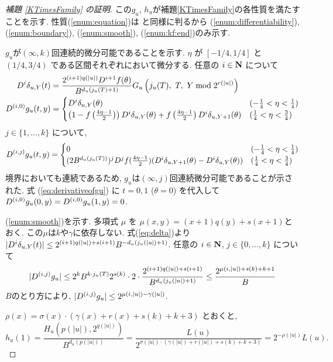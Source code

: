 \begin{proof}[\rm 補題 \ref{KTimesFamily} の証明]
この$g_u$, $h_u$が補題\ref{KTimesFamily}の各性質を満たすことを示す. 
性質(\ref{enum:equation})は
\cite[補題 4.1]{kawamura2010lipschitz}と同様に判るから
(\ref{enum:differentiability}), 
(\ref{enum:boundary}), 
(\ref{enum:smooth}), 
(\ref{enum:kf:end})のみ示す. 

  $g _u$が$(\infty, k)$回連続的微分可能であることを示す.
  $\eta$ が $[-1/4, 1/4]$ と $(1/4, 3/4)$ である区間それぞれにおいて微分する.
  任意の $i \in \mathbf N$ について
  \begin{align}
   D^i \delta_{u,Y}(t) 
&
    = \frac{2^{(i+1)q(|u|)} D^{i+1}f(\theta)}{B^{d_u(j_u(T)+1)}}
    G_u\left( j_u(T),\ T,\ Y \bmod 2^{r(|u|)} \right)
\\
   \label{eq:derivativeofgu}
    D^{(i,0)} g_u(t, y)
&
     = \begin{cases}
 	D^i \delta_{u, Y}(\theta) 
	& (- \frac 1 4 < \eta < \frac 1 4) \\
	\left( 1-f \left(\frac{4\eta-1}{2}\right)\right) 
	D^i \delta_{u, Y}(\theta) 
	+ f \left(\frac{4\eta-1}{2}\right) D^i \delta_{u,Y+1}(\theta) 
	& (\frac 1 4 < \eta < \frac 3 4)
       \end{cases}
  \end{align}
  $j \in \{1, \dots , k\}$ について,
  \begin{equation}
    D^{(i,j)} g_u(t, y)
     = \begin{cases}
	0 & (- \frac 1 4 < \eta < \frac 1 4) \\
	(2B^{d_u(j_u(T))})^j D^j f(\frac{4\eta - 1}2)
	(D^i \delta_{u,Y+1}(\theta)-D^i \delta_{u, Y}(\theta)) 
	& (\frac 1 4 < \eta < \frac 3 4)
       \end{cases}
  \end{equation}
  境界においても連続であるため,
  $g _u$は$(\infty, j)$回連続微分可能であることが示された.
  式 (\ref{eq:derivativeofgu}) に $t = 0, 1$ ($\theta = 0$) を代入して
  $D^{(i, 0)} g_u(0,y) = D^{(i, 0)} g_u(1,y) = 0$.

  (\ref{enum:smooth})を示す.
  多項式 $\mu$ を $\mu(x, y) = (x+1)q(y) + s(x+1)$とおく.
  この$\mu$は$k$や$\gamma$に依存しない.
  式(\ref{eq:delta})より
  $|D^i \delta_{u,Y}(t)| \le 2^{(i+1)q(|u|) + s(i+1)}B^{-d_u(j_u(|u|)+1)}$.
  任意の $i \in \mathbf N$, $j \in \{0, \dots, k\}$ について
  \begin{equation}
   |D^{(i,j)} g_u| 
   \le 
   2^k B^{k \cdot j_u(T)} 2^{s(k)} \cdot 2 \cdot 
   \frac{2^{(i+1)q(|u|) + s(i+1)}}{B^{d_u(j_u(|u|)+1)}} 
   \le
   \frac{2^{\mu(i, |u|) + s(k) + k + 1}}{B}
  \end{equation}
  $B$のとり方により, $|D^{(i,j)} g_u| \leq 2^{\mu(i, |u|) - \gamma(|u|)}$.

  $\rho(x) = \sigma(x) \cdot (\gamma(x)+r(x)+s(k)+k+3)$ とおくと,
  \begin{equation}
   h_u(1) = \frac{H_u(p(|u|), 2^{q(|u|)})}{B^{d_u(p(|u|))}} 
          = \frac{L(u)}{2^{\sigma(|u|) \cdot (\gamma(|u|)+r(|u|)+s(k)+k+3)}}
	  = 2^{-\rho(|u|)} L(u).
  \end{equation}
 \end{proof}



